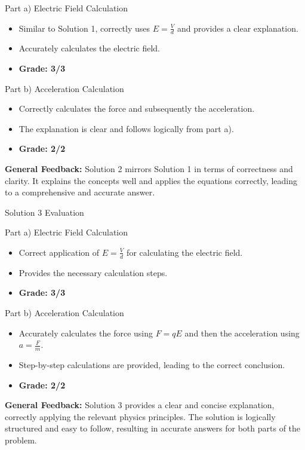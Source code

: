\documentclass[a4paper,11pt]{article}
\begin{document}
Part a) Electric Field Calculation

\begin{itemize}
    \item Similar to Solution 1, correctly uses \(E = \frac{V}{d}\) and provides a clear explanation.
    \item Accurately calculates the electric field.
    \item \textbf{Grade: 3/3}
\end{itemize}

Part b) Acceleration Calculation

\begin{itemize}
    \item Correctly calculates the force and subsequently the acceleration.
    \item The explanation is clear and follows logically from part a).
    \item \textbf{Grade: 2/2}
\end{itemize}

\textbf{General Feedback:} Solution 2 mirrors Solution 1 in terms of correctness and clarity. It explains the concepts well and applies the equations correctly, leading to a comprehensive and accurate answer.

Solution 3 Evaluation

Part a) Electric Field Calculation

\begin{itemize}
    \item Correct application of \(E = \frac{V}{d}\) for calculating the electric field.
    \item Provides the necessary calculation steps.
    \item \textbf{Grade: 3/3}
\end{itemize}

Part b) Acceleration Calculation

\begin{itemize}
    \item Accurately calculates the force using \(F = qE\) and then the acceleration using \(a = \frac{F}{m}\).
    \item Step-by-step calculations are provided, leading to the correct conclusion.
    \item \textbf{Grade: 2/2}
\end{itemize}

\textbf{General Feedback:} Solution 3 provides a clear and concise explanation, correctly applying the relevant physics principles. The solution is logically structured and easy to follow, resulting in accurate answers for both parts of the problem.
\end{document}
